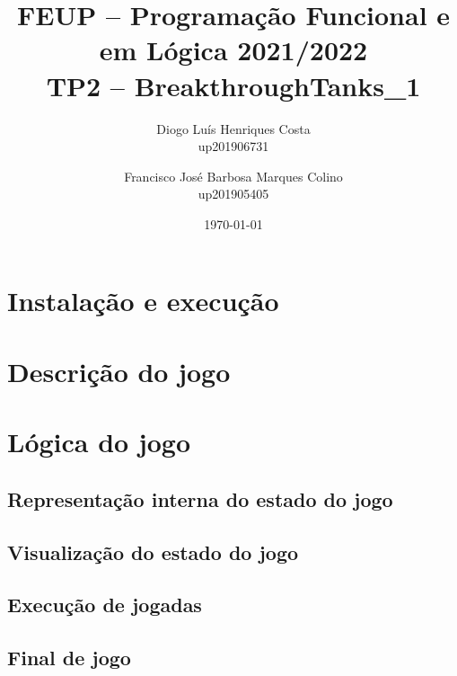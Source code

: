 \documentclass[a4paper,11pt,portuguese]{article}
\begin{document}

\author{
    Diogo Luís Henriques Costa\\
    up201906731
    \and
    Francisco José Barbosa Marques Colino\\
    up201905405
}
\title{FEUP -- Programação Funcional e em Lógica \large 2021/2022 \\ \large TP2 -- BreakthroughTanks\_1}
\date{\today}
\maketitle


\section{Instalação e execução}



\section{Descrição do jogo}



\section{Lógica do jogo}

    \subsection{Representação interna do estado do jogo}



    \subsection{Visualização do estado do jogo}



    \subsection{Execução de jogadas}



    \subsection{Final de jogo}
\end{document}
